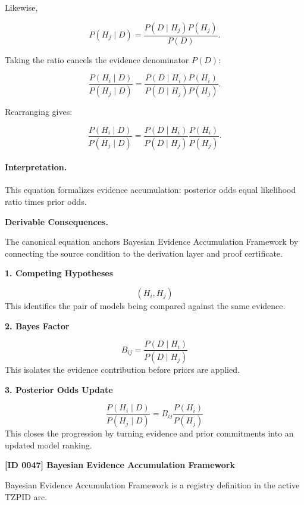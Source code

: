 Likewise,

\begin{equation}
P(H_j\mid D)
=
\frac{P(D\mid H_j)P(H_j)}
{P(D)} .
\end{equation}

Taking the ratio cancels the evidence denominator $P(D)$:

\begin{equation}
\frac{P(H_i\mid D)}
{P(H_j\mid D)}
=
\frac{P(D\mid H_i)P(H_i)}
{P(D\mid H_j)P(H_j)} .
\end{equation}

Rearranging gives:

\begin{equation}
\boxed{
\frac{P(H_i\mid D)}
{P(H_j\mid D)}
=
\frac{P(D\mid H_i)}
{P(D\mid H_j)}
\frac{P(H_i)}
{P(H_j)} .
}
\end{equation}

\paragraph{Interpretation.}
This equation formalizes evidence accumulation: posterior odds equal likelihood ratio times prior odds.

\par\vspace{0.35em}
\noindent\textbf{Derivable Consequences.}\quad
\begingroup
\footnotesize
\raggedright
The canonical equation anchors Bayesian Evidence Accumulation Framework by connecting the source condition to the derivation layer and proof certificate.
\par\endgroup

\noindent\textbf{1. Competing Hypotheses}\par
\[
(H_{i}, H_{j})
\]
\noindent This identifies the pair of models being compared against the same evidence.\par
\noindent\textbf{2. Bayes Factor}\par
\[
B_{ij}
=
\frac{P(D\mid H_{i})}{P(D\mid H_{j})}
\]
\noindent This isolates the evidence contribution before priors are applied.\par
\noindent\textbf{3. Posterior Odds Update}\par
\[
\frac{P(H_{i}\mid D)}{P(H_{j}\mid D)}
=
B_{ij}
\frac{P(H_{i})}{P(H_{j})}
\]
\noindent This closes the progression by turning evidence and prior commitments into an updated model ranking.\par

\clearpage
\noindent\textbf{[ID 0047] Bayesian Evidence Accumulation Framework}\par
\vspace{0.35em}
\begingroup\small
{}
Bayesian Evidence Accumulation Framework is a registry definition in the active TZPID arc.

